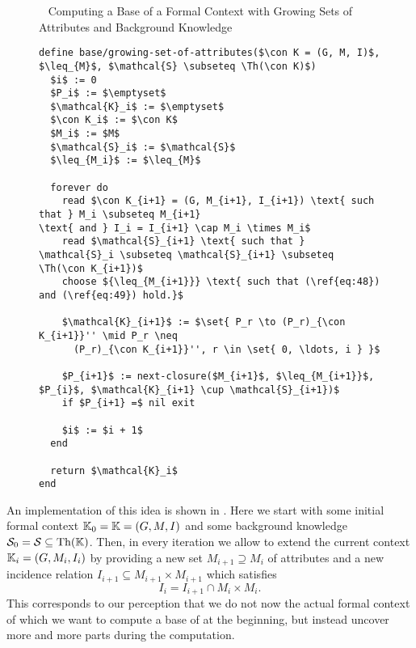 
\begin{figure}[tp]
  \begin{Algorithm}~ Computing a Base of a Formal
    Context with Growing Sets of Attributes and Background Knowledge%
    \label{alg:base/growing-set-of-attributes}
\begin{lstlisting}
define base/growing-set-of-attributes($\con K = (G, M, I)$, $\leq_{M}$, $\mathcal{S} \subseteq \Th(\con K)$)
  $i$ := 0
  $P_i$ := $\emptyset$
  $\mathcal{K}_i$ := $\emptyset$
  $\con K_i$ := $\con K$
  $M_i$ := $M$
  $\mathcal{S}_i$ := $\mathcal{S}$
  $\leq_{M_i}$ := $\leq_{M}$

  forever do
    read $\con K_{i+1} = (G, M_{i+1}, I_{i+1}) \text{ such that } M_i \subseteq M_{i+1}
\text{ and } I_i = I_{i+1} \cap M_i \times M_i$
    read $\mathcal{S}_{i+1} \text{ such that } \mathcal{S}_i \subseteq \mathcal{S}_{i+1} \subseteq \Th(\con K_{i+1})$
    choose ${\leq_{M_{i+1}}} \text{ such that (\ref{eq:48}) and (\ref{eq:49}) hold.}$

    $\mathcal{K}_{i+1}$ := $\set{ P_r \to (P_r)_{\con K_{i+1}}'' \mid P_r \neq
      (P_r)_{\con K_{i+1}}'', r \in \set{ 0, \ldots, i } }$

    $P_{i+1}$ := next-closure($M_{i+1}$, $\leq_{M_{i+1}}$, $P_{i}$, $\mathcal{K}_{i+1} \cup \mathcal{S}_{i+1})$
    if $P_{i+1} =$ nil exit

    $i$ := $i + 1$  
  end

  return $\mathcal{K}_i$  
end    
\end{lstlisting}  
  \end{Algorithm}
\end{figure}

An implementation of this idea is shown in .
Here we start with some initial formal context ${\mathbb{K}}_{0} = {\mathbb{K}} = (G, M, I)$ and some
background knowledge $\mathcal{S}_{0} = \mathcal{S} \subseteq \operatorname{Th}({\mathbb{K}})$.  Then, in
every iteration we allow to extend the current context ${\mathbb{K}}_{i} = (G, M_{i}, I_{i})$ by
providing a new set $M_{i+1} \supseteq M_{i}$ of attributes and a new incidence relation
$I_{i+1} \subseteq M_{i+1} \times M_{i+1}$ which satisfies
\begin{equation*}
  I_{i} = I_{i+1} \cap M_{i} \times M_{i}.
\end{equation*}
This corresponds to our perception that we do not now the actual formal context of which
we want to compute a base of at the beginning, but instead uncover more and more parts
during the computation.

